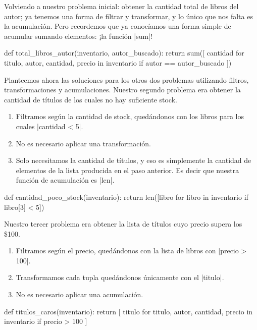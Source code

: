 \begin{subappendices}
Volviendo a nuestro problema inicial: obtener la cantidad total de libros del
autor; ya tenemos una forma de filtrar y transformar, y lo único que nos falta
es la acumulación. Pero recordemos que ya conocíamos una forma simple de
acumular sumando elementos: ¡la función |sum|!

\begin{codigo-python-sn}
def total_libros_autor(inventario, autor_buscado):
    return sum([
        cantidad
        for titulo, autor, cantidad, precio in inventario
        if autor == autor_buscado
    ])
\end{codigo-python-sn}

Planteemos ahora las soluciones para los otros dos problemas utilizando
filtros, transformaciones y acumulaciones. Nuestro segundo problema era obtener
la cantidad de títulos de los cuales no hay suficiente stock.

\begin{enumerate}
    \item Filtramos según la cantidad de stock, quedándonos con los libros
        para los cuales |cantidad < 5|.
    \item No es necesario aplicar una transformación.
    \item Solo necesitamos la cantidad de títulos, y eso es simplemente la
        cantidad de elementos de la lista producida en el paso anterior. Es
        decir que nuestra función de acumulación es |len|.
\end{enumerate}

\begin{codigo-python-sn}
def cantidad_poco_stock(inventario):
    return len([libro for libro in inventario if libro[3] < 5])
\end{codigo-python-sn}

Nuestro tercer problema era obtener la lista de títulos cuyo precio supera los
\$100.

\begin{enumerate}
    \item Filtramos según el precio, quedándonos con la lista de libros con
        |precio > 100|.
    \item Transformamos cada tupla quedándonos únicamente con el |titulo|.
    \item No es necesario aplicar una acumulación.
\end{enumerate}

\begin{codigo-python-sn}
def titulos_caros(inventario):
    return [
        titulo
        for titulo, autor, cantidad, precio in inventario
        if precio > 100
    ]
\end{codigo-python-sn}


\end{subappendices}
